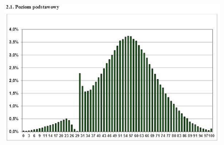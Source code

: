 \documentclass[12pt, a4paper, oneside]{article}
\begin{document}
 \begin{figure}[H]\label{pic:2}
	\begin{center}
		\includegraphics[scale=0.65]{EGE_poland.jpg}
	\end{center}
\end{figure}
\end{document}
